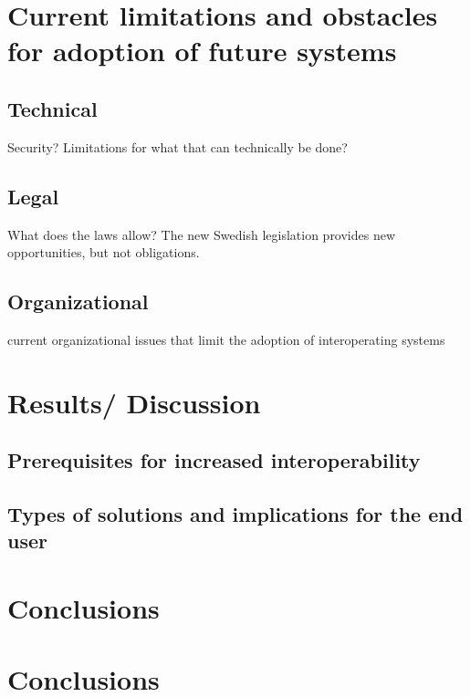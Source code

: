 \documentclass[12pt]{article}
\begin{document}
\section{Current limitations and obstacles for adoption of future systems}

\subsection{Technical}
Security? Limitations for what that can technically be done?

\subsection{Legal}
What does the laws allow? The new Swedish legislation provides new opportunities, but not obligations. \Cite{RiR201119}

\subsection{Organizational}
current organizational issues that limit the adoption of interoperating systems

\section{Results/ Discussion}

\subsection{ Prerequisites for increased interoperability}

\subsection{Types of solutions and implications for the end user}

\section{Conclusions}

\section{Conclusions}

\newpage
\begin{appendix}


\end{appendix}

\newpage
 
 
\end{document}
